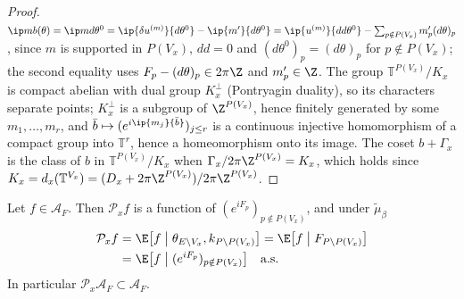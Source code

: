 \begin{proof}
$\ip m{b(\theta)}=\ip m{d\theta^0}=\ip{\delta u^{(m)}}{d\theta^0}-\ip{m'}
{d\theta^0}=\ip{u^{(m)}}{dd\theta^0}-\sum_{p\notin P(V_x)}m'_p(d\theta)_p$,
since $m$ is supported in $P(V_x)$, $dd=0$ and $(d\theta^0)_p=(d\theta)_p$
for $p\notin P(V_x)$; the second equality uses $F_p-(d\theta)_p\in2\pi\Z$ and
$m'_p\in\Z$. The group $\mathbb T^{P(V_x)}/K_x$ is compact abelian with dual
group $K_x^\perp$ (Pontryagin duality), so its characters separate points;
$K_x^\perp$ is a subgroup of $\Z^{P(V_x)}$, hence finitely generated by
some $m_1,\dots,m_r$, and $\bar b\mapsto(e^{i\ip{m_j}{\bar b}})_{j\le r}$ is a
continuous injective homomorphism of a compact group into $\mathbb T^r$,
hence a homeomorphism onto its image. The coset $b+\Gamma_x$ is the class
of $b$ in $\mathbb T^{P(V_x)}/K_x$ when $\Gamma_x/2\pi\Z^{P(V_x)}=K_x$, which
holds since $K_x=d_x(\mathbb T^{V_x})=(D_x+2\pi\Z^{P(V_x)})/2\pi\Z^{P(V_x)}$.
\end{proof}

\begin{corollary}
\label{rM3:exterior}
Let $f\in\mathcal A_F$. Then $\mathcal P_xf$ is a function of
$(e^{iF_p})_{p\notin P(V_x)}$, and under $\tilde\mu_\beta$
\begin{align*}
\mathcal P_xf&=\E\bigl[f\bigm|\theta_{E\setminus V_x},k_{P\setminus P(V_x)}
\bigr]=\E\bigl[f\bigm|F_{P\setminus P(V_x)}\bigr]\\
&=\E\bigl[f\bigm|(e^{iF_p})_{p\notin P(V_x)}\bigr]\quad\text{a.s.}
\end{align*}
In particular $\mathcal P_x\mathcal A_F\subset\mathcal A_F$.
\end{corollary}

